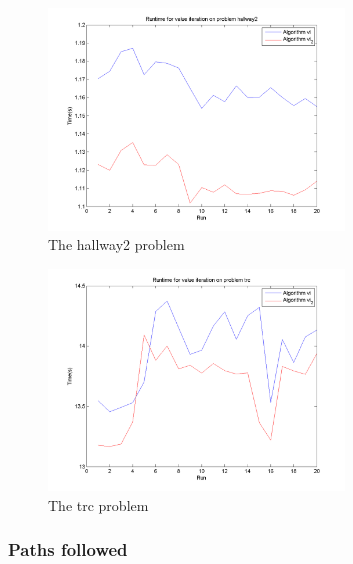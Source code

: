 \documentclass[10pt,a4paper]{article}
\begin{document}
\begin{figure}
\vspace{-20pt}
\hspace{-30pt}
\centering
\includegraphics[width=0.7\textwidth]{Timings/hallway2/timings_vi.png}
\caption{The hallway2 problem}
\hspace{-30pt}
\label{fig:vi_hallway2}
\vspace{-20pt}
\end{figure}
        
\begin{figure}
\vspace{-20pt}
\hspace{-30pt}
\centering
\includegraphics[width=0.7\textwidth]{Timings/trc/timings_vi.png}
\hspace{-30pt}
\caption{The trc problem}
\label{fig:vi_trc}
\vspace{-20pt}
\end{figure}


\subsubsection*{Paths followed}
\end{document}
